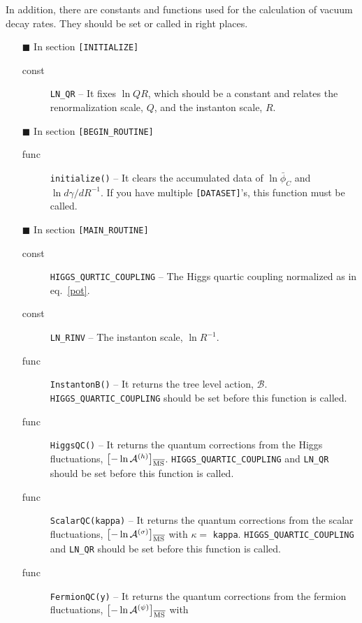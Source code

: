 \documentclass[12pt]{article}
\begin{document}
In addition, there are constants and functions used for the calculation
of vacuum decay rates. They should be set or called in right places.
\begin{itemize}
 \item[$\blacksquare$] In section \verb|[INITIALIZE]|
\begin{description}
 \item[const] \verb|LN_QR| -- It fixes $\ln QR$, which should be
       a constant and relates the renormalization scale, $Q$, and the
       instanton scale, $R$.
\end{description}
 \item[$\blacksquare$] In section \verb|[BEGIN_ROUTINE]|
\begin{description}
 \item[func] \verb|initialize()| -- It clears the accumulated data of $\ln\bar\phi_C$ and
      $\ln d\gamma/dR^{-1}$. If you have multiple \verb|[DATASET]|'s, this
       function must be called.
\end{description}
 \item[$\blacksquare$] In section \verb|[MAIN_ROUTINE]|
\begin{description}
 \item[const] \verb|HIGGS_QURTIC_COUPLING| -- The Higgs quartic coupling
	      normalized as in eq.~\eqref{pot}.
 \item[const] \verb|LN_RINV| -- The instanton scale, $\ln R^{-1}$.
 \item[func]  \verb|InstantonB()| -- It returns the tree level action,
              $\mathcal B$. \verb|HIGGS_QUARTIC_COUPLING|
             should be set before this function is called.
 \item[func] \verb|HiggsQC()| -- It returns the quantum corrections 
             from the Higgs fluctuations,
             $\left[-\ln\mathcal A^{(h)}\right]_{\rm \overline{MS}}$.
             \verb|HIGGS_QUARTIC_COUPLING| and \verb|LN_QR|
             should be set before this function is called.
 \item[func] \verb|ScalarQC(kappa)| -- It returns the quantum corrections
             from the scalar fluctuations, 
             $\left[-\ln\mathcal A^{(\sigma)}\right]_{\rm \overline{MS}}$
             with $\kappa=$ \verb|kappa|. \verb|HIGGS_QUARTIC_COUPLING| 
             and \verb|LN_QR| should be set before this function is called.
  \item[func] \verb|FermionQC(y)| -- It returns the quantum corrections from
               the fermion fluctuations, 
              $\left[-\ln\mathcal A^{(\psi)}\right]_{\rm \overline{MS}}$ with

\end{description}
\end{itemize}
\end{document}
